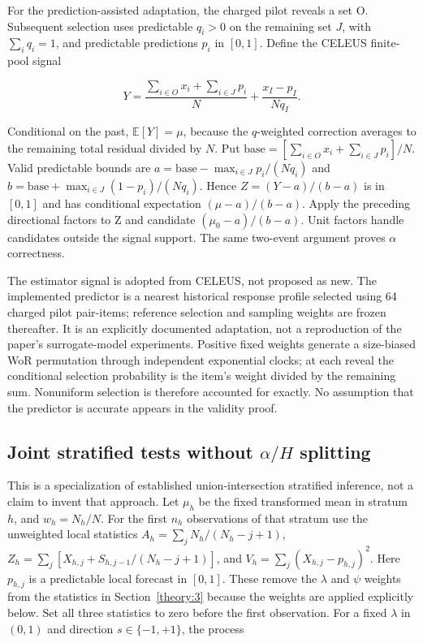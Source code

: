 For the prediction-assisted adaptation, the charged pilot reveals a set O. Subsequent selection uses predictable \(q_i>0\) on the remaining set \(J\), with \(\sum_i q_i=1\), and predictable predictions \(p_i\) in \([0,1]\). Define the CELEUS finite-pool signal

\begin{equation}\label{eq:proofs-12}
Y=\frac{\sum_{i\in O}x_i+\sum_{i\in J}p_i}{N}+\frac{x_I-p_I}{Nq_I}.
\end{equation}

Conditional on the past, \(\mathbb E[Y]=\mu\), because the \(q\)-weighted correction averages to the remaining total residual divided by \(N\). Put \(\mathrm{base}=[\sum_{i\in O}x_i+\sum_{i\in J}p_i]/N\). Valid predictable bounds are \(a=\mathrm{base}-\max_{i\in J}p_i/(Nq_i)\) and \(b=\mathrm{base}+\max_{i\in J}(1-p_i)/(Nq_i)\). Hence \(Z=(Y-a)/(b-a)\) is in \([0,1]\) and has conditional expectation \((\mu-a)/(b-a)\). Apply the preceding directional factors to Z and candidate \((\mu_0-a)/(b-a)\). Unit factors handle candidates outside the signal support. The same two-event argument proves \(\alpha\) correctness.

The estimator signal is adopted from CELEUS, not proposed as new. The implemented predictor is a nearest historical response profile selected using 64 charged pilot pair-items; reference selection and sampling weights are frozen thereafter. It is an explicitly documented adaptation, not a reproduction of the paper's surrogate-model experiments. Positive fixed weights generate a size-biased WoR permutation through independent exponential clocks; at each reveal the conditional selection probability is the item's weight divided by the remaining sum. Nonuniform selection is therefore accounted for exactly. No assumption that the predictor is accurate appears in the validity proof.

\subsection{\texorpdfstring{Joint stratified tests without \(\alpha/H\) splitting}{Joint stratified tests without \textbackslash alpha/H splitting}}\label{theory:9}

This is a specialization of established union-intersection stratified inference, not a claim to invent that approach. Let \(\mu_h\) be the fixed transformed mean in stratum \(h\), and \(w_h=N_h/N\). For the first \(n_h\) observations of that stratum use the unweighted local statistics \(A_h=\sum_j N_h/(N_h-j+1)\), \(Z_h=\sum_j[X_{h,j}+S_{h,j-1}/(N_h-j+1)]\), and \(V_h=\sum_j(X_{h,j}-p_{h,j})^2\). Here \(p_{h,j}\) is a predictable local forecast in \([0,1]\). These remove the \(\lambda\) and \(\psi\) weights from the statistics in Section~\ref{theory:3} because the weights are applied explicitly below. Set all three statistics to zero before the first observation. For a fixed \(\lambda\) in \((0,1)\) and direction \(s\in\{-1,+1\}\), the process

